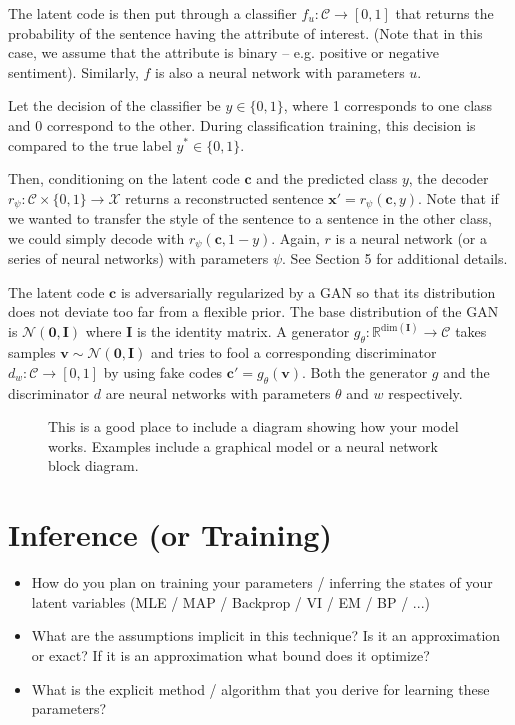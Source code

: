 \documentclass{article}
\newcommand{\vect}[1]{\boldsymbol{#1}}
\begin{document}
The latent code is then put through a classifier $f_u : \mathcal{C} \to [0, 1]$ that returns the probability of the sentence having the attribute of interest.  (Note that in this case, we assume that the attribute is binary -- e.g. positive or negative sentiment).  Similarly, $f$ is also a neural network with parameters $u$.  

Let the decision of the classifier be $y \in \{0, 1\}$, where 1 corresponds to one class and 0 correspond to the other.  During classification training, this decision is compared to the true label $y^* \in \{0, 1\}$.  

Then, conditioning on the latent code $\vect{c}$ and the predicted class $y$, the decoder $r_\psi : \mathcal{C} \times \{0, 1\} \to \mathcal{X}$ returns a reconstructed sentence $\vect{x}' = r_\psi(\vect{c}, y)$.  Note that if we wanted to transfer the style of the sentence to a sentence in the other class, we could simply decode with $r_\psi(\vect{c}, 1 - y)$.  Again, $r$ is a neural network (or a series of neural networks) with parameters $\psi$.  See Section 5 for additional details.      

The latent code $\vect{c}$ is adversarially regularized by a GAN so that its distribution does not deviate too far from a flexible prior.  The base distribution of the GAN is $\mathcal{N}(\vect{0}, \vect{I})$ where $\vect{I}$ is the identity matrix.  A generator $g_\theta : \mathbb{R}^{\text{dim}(\vect{I})} \to \mathcal{C}$ takes samples $\vect{v} \sim \mathcal{N}(\vect{0}, \vect{I})$ and tries to fool a corresponding discriminator $d_w : \mathcal{C} \to [0, 1]$ by using fake codes $\vect{c}' = g_\theta(\vect{v})$.  Both the generator $g$ and the discriminator $d$ are neural networks with parameters $\theta$ and $w$ respectively.

            


\begin{figure}
  \centering
  \missingfigure[figheight=8cm]{}
  \caption{\label{fig:diagram} This is a good place to include a diagram showing how your model works. Examples include a graphical model or a neural network block diagram.}
\end{figure}


\section{Inference (or Training)}

\begin{itemize}
\item How do you plan on training your parameters / inferring the
  states of your latent variables (MLE / MAP / Backprop / VI / EM / BP / ...)

\item What are the assumptions implicit in this technique? Is it an approximation or exact? If it is an approximation what bound does it optimize?

\item What is the explicit method / algorithm that you derive for learning these parameters?
\end{itemize}
\end{document}
